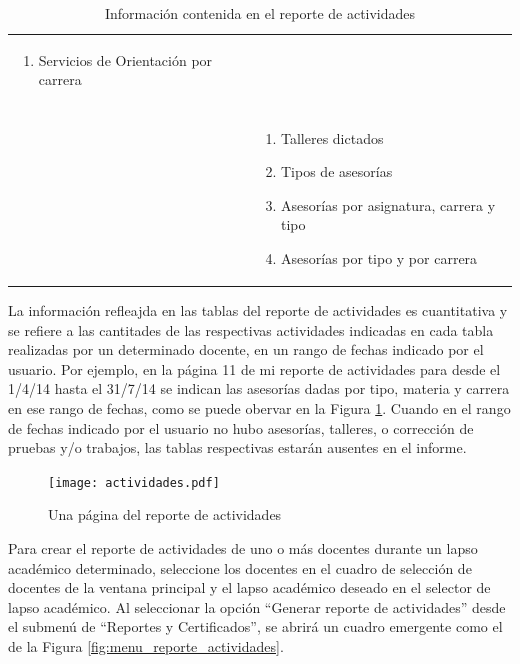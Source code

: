 \documentclass[letterpaper,12pt]{book}
\begin{document}
\begin{table}[!ht]
\begin{tabular}{|p{30ex}|p{30ex}|}
{\begin{enumerate}[label=\protect\fcolorbox{charcoal}{charcoal}{\textcolor{white}{\theenumi}}]
				\item Servicios de Orientación por carrera
			\end{enumerate}} \\
		\cline{2-2}
		&	\cellcolor{uclablue}{\makebox[30ex][c]{\textcolor{white}{Preparadores}}} \\
		\cline{2-2}
		&	\parbox[t]{27ex}{\begin{enumerate}[label=\protect\fcolorbox{uclablue}{uclablue}{\textcolor{white}{\theenumi}}]
				\itemsep0em
				\item Talleres dictados
				\item Tipos de asesorías
				\item Asesorías por asignatura, carrera y tipo
				\item Asesorías por tipo y por carrera
			\end{enumerate}}\\
		\hline
	\end{tabular}
	\caption{Información contenida en el reporte de actividades}
	\label{tab:reporte_actividades}
\end{table}

\newpage
La información refleajda en las tablas del reporte de actividades es cuantitativa y se refiere a las cantitades de las respectivas actividades indicadas en cada tabla realizadas por un determinado docente, en un rango de fechas indicado por el usuario. Por ejemplo, en la página 11 de mi reporte de actividades para desde el 1/4/14 hasta el 31/7/14 se indican las asesorías dadas por tipo, materia y carrera en ese rango de fechas, como se puede obervar en la Figura \ref{fig:reporte_actividades_pdf}. Cuando en el rango de fechas indicado por el usuario no hubo asesorías, talleres, o corrección de pruebas y/o trabajos, las tablas respectivas estarán ausentes en el informe.

\begin{figure}[!ht]
	\centering
	\texttt{[image: actividades.pdf]}
	\caption{Una página del reporte de actividades}
	\label{fig:reporte_actividades_pdf}
\end{figure}

Para crear el reporte de actividades de uno o más docentes durante un lapso académico determinado, seleccione los docentes en el cuadro de selección de docentes de la ventana principal y el lapso académico deseado en el selector de lapso académico. Al seleccionar la opción ``Generar reporte de actividades'' desde el submenú de ``Reportes y Certificados'', se abrirá un cuadro emergente como el de la Figura \ref{fig:menu_reporte_actividades}.
\end{document}
